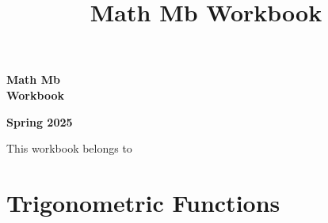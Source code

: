 \documentclass[letterpaper]{memoir}
\title{Math Mb Workbook}
\author{}
\newcommand{\chaptertwo}{Trigonometric Functions}
\begin{document}
\begin{titlingpage}
\vspace*{1.5in} %

\begin{center}
    \fontsize{96pt}{108pt}\selectfont\sffamily%
    \textbf{Math Mb \\ Workbook} 
\end{center}

\vspace*{\fill}

\begin{center}
    \fontsize{48pt}{60pt}\selectfont\sffamily%
    \textbf{Spring 2025} 
\end{center}

\vspace*{\fill} %

\begin{center}
    \LARGE\sffamily %
    This workbook belongs to \underline{\hspace{10cm}} %
\end{center}

\end{titlingpage}

\pagestyle{empty}
\frontmatter

\tableofcontents*
\clearpage

\pagestyle{workbook}
\mainmatter

\clearpage











\chapter{\chaptertwo}
\clearpage










\end{document}
